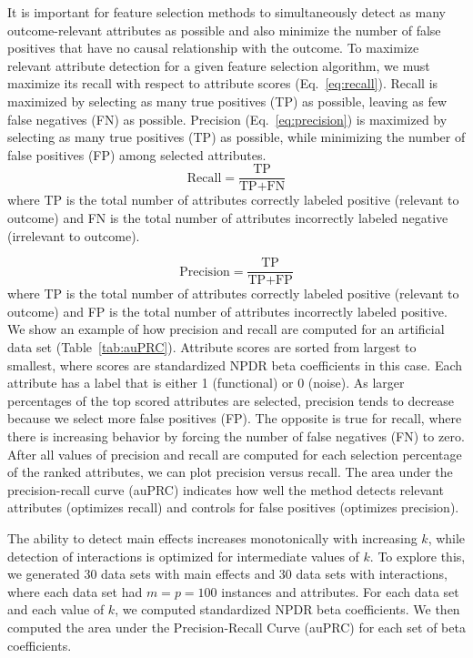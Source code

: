 \documentclass[10pt,letterpaper]{article}
\begin{document}
It is important for feature selection methods to simultaneously detect as many outcome-relevant attributes as possible and also minimize the number of false positives that have no causal relationship with the outcome. To maximize relevant attribute detection for a given feature selection algorithm, we must maximize its recall with respect to attribute scores (Eq.~\ref{eq:recall}). Recall is maximized by selecting as many true positives (TP) as possible, leaving as few false negatives (FN) as possible. Precision (Eq.~\ref{eq:precision}) is maximized by selecting as many true positives (TP) as possible, while minimizing the number of false positives (FP) among selected attributes.
%
\begin{equation}\label{eq:recall}
\text{Recall} = \frac{\text{TP}}{\text{TP} + \text{FN}}
\end{equation}
%
where TP is the total number of attributes correctly labeled positive (relevant to outcome) and FN is the total number of attributes incorrectly labeled negative (irrelevant to outcome).

\begin{equation}\label{eq:precision}
\text{Precision} = \frac{\text{TP}}{\text{TP}+\text{FP}}
\end{equation}
%
where TP is the total number of attributes correctly labeled positive (relevant to outcome) and FP is the total number of attributes incorrectly labeled positive. We show an example of how precision and recall are computed for an artificial data set (Table~\ref{tab:auPRC}). Attribute scores are sorted from largest to smallest, where scores are standardized NPDR beta coefficients in this case. Each attribute has a label that is either 1 (functional) or 0 (noise). As larger percentages of the top scored attributes are selected, precision tends to decrease because we select more false positives (FP). The opposite is true for recall, where there is increasing behavior by forcing the number of false negatives (FN) to zero. After all values of precision and recall are computed for each selection percentage of the ranked attributes, we can plot precision versus recall. The area under the precision-recall curve (auPRC) indicates how well the method detects relevant attributes (optimizes recall) and controls for false positives (optimizes precision).

The ability to detect main effects increases monotonically with increasing $k$, while detection of interactions is optimized for intermediate values of $k$. To explore this, we generated 30 data sets with main effects and 30 data sets with interactions, where each data set had $m=p=100$ instances and attributes. For each data set and each value of $k$, we computed standardized NPDR beta coefficients. We then computed the area under the Precision-Recall Curve (auPRC) for each set of beta coefficients.
\end{document}
